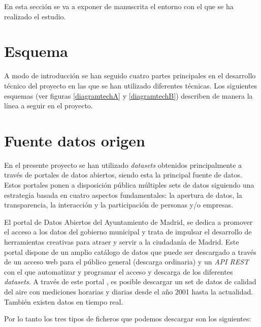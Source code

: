 
En esta sección se va a exponer de manuscrita el entorno con el que se ha realizado el estudio. 


\section{Esquema}

A modo de introducción se han seguido cuatro partes principales en el desarrollo técnico del proyecto en las que se han utilizado diferentes técnicas. Los siguientes esquemas (ver figuras \ref{diagramtechA} y \ref{diagramtechB}) describen de manera la línea a seguir en el proyecto.


\section{Fuente datos origen}

En el presente proyecto se han utilizado \textit{datasets} obtenidos principalmente a través de portales de datos abiertos, siendo esta la principal fuente de datos. Estos portales ponen a disposición pública múltiples sets de datos siguiendo una estrategia basada en cuatro aspectos fundamentales: la apertura de datos, la transparencia, la interacción y la participación de personas y/o empresas. 

El portal de Datos Abiertos del Ayuntamiento de Madrid, se dedica a promover el acceso a los datos del gobierno municipal y trata de impulsar el desarrollo de herramientas creativas para atraer y servir a la ciudadanía de Madrid. 
Este portal dispone de un amplio catálogo de datos que puede ser descargado a través de un acceso web para el público general (descarga ordinaria) y un \textit{API REST} con el que automatizar y programar el acceso y descarga de los diferentes \textit{datasets}. A través de este portal \cite{portal_datosabiertos_madrid}, es posible descargar un set de datos de calidad del aire con mediciones horarias y diarias desde el año 2001 hasta la actualidad. También existen datos en tiempo real.

Por lo tanto los tres tipos de ficheros que podemos descargar son los siguientes:

